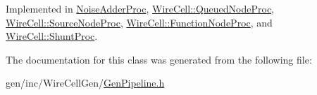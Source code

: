 Implemented in \hyperlink{class_noise_adder_proc_aa0b42db936bac1b8686e28e84e96b6ef}{Noise\+Adder\+Proc}, \hyperlink{class_wire_cell_1_1_queued_node_proc_acf62ea51c7b689e364721888479473b6}{Wire\+Cell\+::\+Queued\+Node\+Proc}, \hyperlink{class_wire_cell_1_1_source_node_proc_af23d814862a6fed4a20e37313255c179}{Wire\+Cell\+::\+Source\+Node\+Proc}, \hyperlink{class_wire_cell_1_1_function_node_proc_a6aa2af5dd1edf32d89e1841d4484c77e}{Wire\+Cell\+::\+Function\+Node\+Proc}, and \hyperlink{class_wire_cell_1_1_shunt_proc_ad03629b595bca9460788378fc2533518}{Wire\+Cell\+::\+Shunt\+Proc}.



The documentation for this class was generated from the following file\+:\begin{DoxyCompactItemize}
\item 
gen/inc/\+Wire\+Cell\+Gen/\hyperlink{_gen_pipeline_8h}{Gen\+Pipeline.\+h}\end{DoxyCompactItemize}
